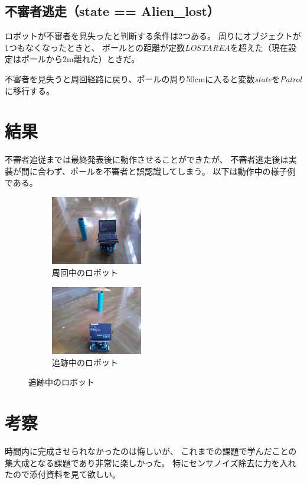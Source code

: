 \documentclass[main]{subfiles}
\begin{document}
\subsection{不審者逃走（state == Alien\_lost）}
ロボットが不審者を見失ったと判断する条件は2つある。
周りにオブジェクトが1つもなくなったときと、
ポールとの距離が定数\textit{LOSTAREA}を超えた（現在設定はポールから2m離れた）ときだ。

不審者を見失うと周回経路に戻り、ポールの周り50cmに入ると変数\textit{state}を\textit{Patrol}に移行する。

\section{結果}
不審者追従までは最終発表後に動作させることができたが、
不審者逃走後は実装が間に合わず、ポールを不審者と誤認識してしまう。
以下は動作中の様子例である。

\begin{figure}[H]
	\begin{minipage}{0.5\hsize}
		\begin{figure}[H]
			\centering
			\includegraphics[width=4cm]{img/photo_pole1.jpg}
			\caption{周回中のロボット}
		\end{figure}
	\end{minipage}
	\begin{minipage}{0.5\hsize}
		\begin{figure}[H]
			\centering
			\includegraphics[width=4cm]{img/photo_pole2.jpg}
			\caption{追跡中のロボット}
		\end{figure}
	\end{minipage}
\end{figure}

\section{考察}
時間内に完成させられなかったのは悔しいが、
これまでの課題で学んだことの集大成となる課題であり非常に楽しかった。
特にセンサノイズ除去に力を入れたので添付資料を見て欲しい。
\end{document}
